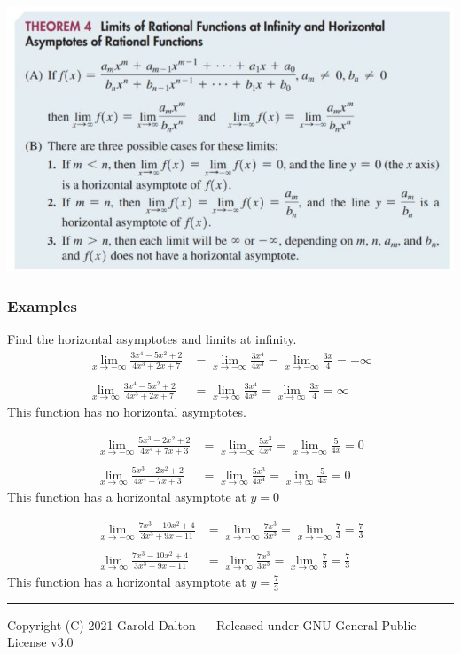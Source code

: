 \documentclass[14pt]{extarticle}
\begin{document}
\begin{center}
	\includegraphics[width=1\textwidth]{9-2-20d}
\end{center}
\subsubsection{Examples}
Find the horizontal asymptotes and limits at infinity.
\begin{align*}
	\lim_{x\to -\infty} \frac{3x^4-5x^2 +2}{4x^3+2x+7} &= \lim_{x\to -\infty} \frac{3x^4}{4x^3} =
	\lim_{x\to -\infty} \frac{3x}{4} = -\infty \\\\
	\lim_{x\to \infty} \frac{3x^4-5x^2 +2}{4x^3+2x+7} &= \lim_{x\to \infty} \frac{3x^4}{4x^3} =
	\lim_{x\to \infty} \frac{3x}{4} = \infty
\end{align*}
This function has no horizontal asymptotes.

\begin{align*}
	\lim_{x\to -\infty} \frac{5x^3-2x^2 +2}{4x^4+7x+3} &= \lim_{x\to -\infty} \frac{5x^3}{4x^4} =
	\lim_{x\to -\infty} \frac{5}{4x} = 0 \\\\
	\lim_{x\to \infty} \frac{5x^3-2x^2 +2}{4x^4+7x+3} &= \lim_{x\to \infty} \frac{5x^3}{4x^4} =
	\lim_{x\to \infty} \frac{5}{4x} = 0
\end{align*}
This function has a horizontal asymptote at $y=0$

\begin{align*}
	\lim_{x\to -\infty} \frac{7x^3-10x^2 +4}{3x^3+9x-11} &= \lim_{x\to -\infty} \frac{7x^3}{3x^3} =
	\lim_{x\to -\infty} \frac{7}{3} = \frac{7}{3} \\\\
	\lim_{x\to \infty} \frac{7x^3-10x^2 +4}{3x^3+9x-11} &= \lim_{x\to \infty} \frac{7x^3}{3x^3} =
	\lim_{x\to \infty} \frac{7}{3} = \frac{7}{3} 
\end{align*}
This function has a horizontal asymptote at $y=\frac{7}{3}$




\noindent\rule{\textwidth}{1pt}
{\footnotesize Copyright (C) 2021 Garold Dalton --- Released under GNU General Public License v3.0}


\cleardoublepage
\end{document}
